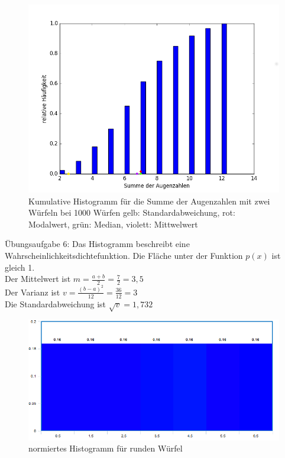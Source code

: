 \documentclass[fleqn,a4paper,12pt]{article}
\begin{document}
  \begin{figure}
    \includegraphics[width=1.0\textwidth]{histo5.png}
    \caption{Kumulative Histogramm für die Summe der Augenzahlen mit zwei Würfeln bei 1000 Würfen \newline gelb: Standardabweichung, rot: Modalwert, grün: Median, violett: Mittwelwert}
  \end{figure}
  \newpage
  \newpage
	Übungsaufgabe 6: \newline
	Das Histogramm beschreibt eine Wahrscheinlichkeitsdichtefunktion. Die Fl\"ache unter der Funktion $p(x)$ ist gleich 1. \\
	Der Mittelwert ist $m = \frac{a+b}{2} = \frac{7}{2} = 3,5$ \\
	Der Varianz ist $v = \frac{(b-a)^2}{12} = \frac{36}{12} = 3 $ \\
  Die Standardabweichung ist $\sqrt{v} = 1,732$
  \begin{figure}
		\includegraphics[width=1.0\textwidth]{H1.PNG}
		\caption{normiertes Histogramm f\"ur runden W\"urfel}
	\end{figure}
  
\end{document}
